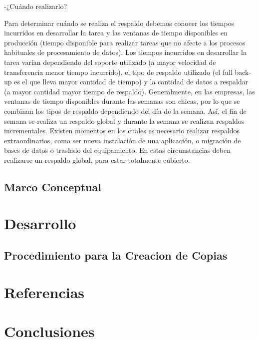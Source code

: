 \documentclass[12pt,letterpaper]{article}
\begin{document}
\newpage

-¿Cuándo realizarlo? 

Para determinar cuándo se realiza el respaldo debemos conocer los tiempos incurridos en desarrollar la tarea y las ventanas de tiempo disponibles en producción (tiempo disponible para realizar tareas que no afecte a los procesos habituales de procesamiento de datos). Los tiempos incurridos en desarrollar la tarea varían dependiendo del soporte utilizado (a mayor velocidad de transferencia menor tiempo incurrido), el tipo de respaldo utilizado (el full back-up es el que lleva mayor cantidad de tiempo) y la cantidad de datos a respaldar (a mayor cantidad mayor tiempo de respaldo). 
Generalmente, en las empresas, las ventanas de tiempo disponibles durante las semanas son chicas, por lo que se combinan los tipos de respaldo  dependiendo del día de la semana. Así, el fin de semana se realiza un respaldo global y durante la semana se realizan respaldos incrementales. Existen momentos en los cuales es necesario realizar respaldos extraordinarios, como ser nueva instalación de una aplicación, o migración de bases de datos o traslado del equipamiento. En estas circunstancias deben realizarse un respaldo global, para estar totalmente cubierto. \\







\subsection{Marco Conceptual}

\newpage

\section{Desarrollo}
\subsection{Procedimiento para la Creacion de Copias}

\newpage
\section{Referencias}
\newpage 
\section{Conclusiones} 
\end{document}
